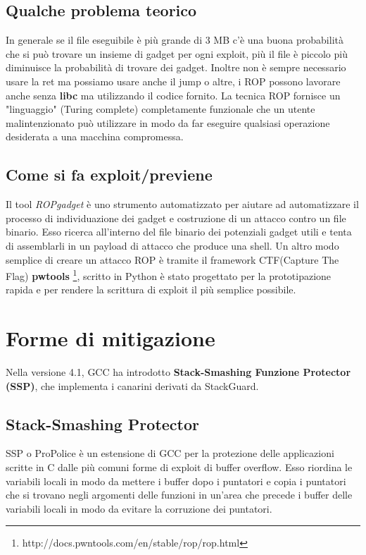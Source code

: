 \subsection{Qualche problema teorico}
In generale se il file eseguibile è più grande di 3 MB c'è una buona probabilità che si può trovare un insieme di gadget per ogni exploit, più il file è piccolo più diminuisce la probabilità di trovare dei gadget. Inoltre non è sempre necessario usare la ret ma possiamo usare anche il jump o altre, i ROP possono lavorare anche senza \textbf{libc} ma utilizzando il codice fornito. La tecnica ROP fornisce un  "linguaggio" (Turing complete) completamente funzionale che un utente malintenzionato può utilizzare
in modo da far eseguire  qualsiasi operazione desiderata a una macchina compromessa.

\subsection{Come si fa exploit/previene}
Il tool \textit{ROPgadget} è uno strumento automatizzato per aiutare ad automatizzare il processo di individuazione dei gadget e costruzione di un attacco contro un file binario. Esso ricerca all'interno del file binario dei potenziali gadget utili e tenta di assemblarli in un payload di attacco che produce una shell. Un altro modo semplice di creare un attacco ROP è tramite il framework CTF(Capture The Flag) \textbf{pwtools} \footnote{http://docs.pwntools.com/en/stable/rop/rop.html}, scritto in Python è stato progettato per la prototipazione rapida e per rendere la scrittura di exploit il più semplice possibile.


\newpage
\section{Forme di mitigazione}
Nella versione 4.1, GCC ha introdotto \textbf{Stack-Smashing Funzione Protector (SSP)}, che implementa i canarini derivati da StackGuard. 

\subsection{Stack-Smashing Protector}
SSP o ProPolice è un estensione di GCC per la protezione delle applicazioni scritte in C dalle più comuni forme di exploit di buffer overflow. Esso riordina le variabili locali in modo da mettere i buffer dopo i puntatori e copia i puntatori che si trovano negli argomenti delle funzioni in un'area che precede i buffer delle variabili locali in modo da evitare la corruzione dei puntatori. 

